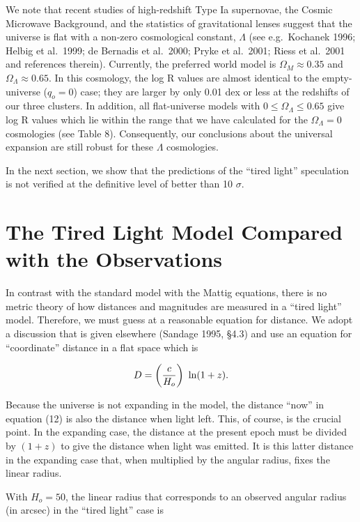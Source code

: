 \documentclass[preprint]{aastex}
\begin{document}
We note that recent studies of high-redshift Type Ia supernovae, the
Cosmic Microwave Background, and the statistics of gravitational
lenses suggest that the universe is flat with a non-zero cosmological
constant, $\Lambda$ (see e.g.\ Kochanek 1996; Helbig et al.\ 1999; de
Bernadis et al.\ 2000; Pryke et al.\ 2001; Riess et al.\ 2001 and
references therein).  Currently, the preferred world model is
$\Omega_M \approx 0.35$ and $\Omega_{\Lambda} \approx 0.65$.  In this
cosmology, the log R values are almost identical to the empty-universe
($q_o = 0$) case; they are larger by only 0.01 dex or less at the
redshifts of our three clusters.  In addition, all flat-universe
models with $0 \le \Omega_{\Lambda} \le 0.65$ give log R values which
lie within the range that we have calculated for the $\Omega_{\Lambda}
= 0$ cosmologies (see Table 8).  Consequently, our conclusions about
the universal expansion are still robust for these $\Lambda$
cosmologies.

In the next section, we show that the predictions of the ``tired
light'' speculation is not verified at the definitive level of better
than 10 $\sigma$.

\section{The Tired Light Model Compared with the Observations}

In contrast with the standard model with the Mattig equations, there
is no metric theory of how distances and magnitudes are measured in a
``tired light'' model.  Therefore, we must guess at a reasonable
equation for distance. We adopt a discussion that is given elsewhere
(Sandage 1995, \S 4.3) and use an equation for ``coordinate'' distance
in a flat space which is 

\begin{equation}
D = \left ({c\over{H_o}} \right)~{\rm ln}(1 + z).
\end{equation}

Because the universe is not expanding in the model, the distance
``now'' in equation (12) is also the distance when light left. This,
of course, is the crucial point. In the expanding case, the distance
at the present epoch must be divided by $(1 + z)$ to give the distance
when light was emitted. It is this latter distance in the expanding
case that, when multiplied by the angular radius, fixes the linear
radius.

With $H_o = 50$, the linear radius that corresponds to an observed
angular radius (in arcsec) in the ``tired light'' case is
   
\end{document}
